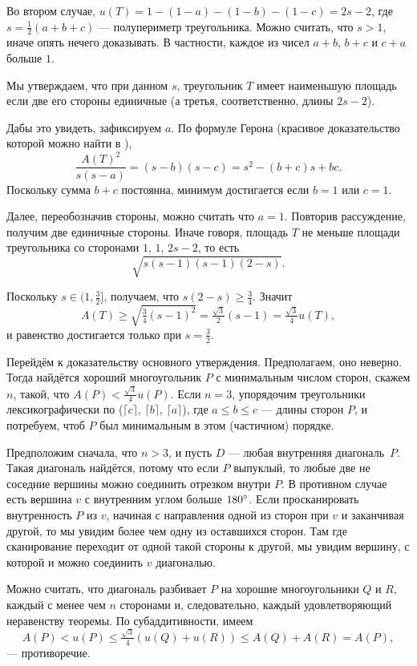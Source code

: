 Во втором случае,
$u(T)=1-(1-a)-(1-b)-(1-c)=2s-2$, где $s=\tfrac12(a+b+c)$ --- полупериметр треугольника.
Можно считать, что $s > 1$, иначе опять нечего доказывать.
В частности, каждое из чисел $a+b$, $b+c$ и $c+a$ больше $1$.

Мы утверждаем, что при данном $s$, треугольник $T$ имеет наименьшую площадь если две его стороны единичные (а третья, соответственно, длины $2s - 2$).

Дабы это увидеть, зафиксируем $a$. 
По формуле Герона (красивое доказательство которой можно найти в \cite{39}),
\[\frac{A(T)^2}{s(s-a)}=(s-b)(s-c)=s^2-(b+c)s+bc.\]
Поскольку сумма $b + c$ постоянна, минимум достигается если $b = 1$ или $c = 1$.

Далее, переобозначив стороны, можно считать что $a = 1$.
Повторив рассуждение, получим две единичные стороны.
Иначе говоря, площадь $T$ не меньше площади треугольника со сторонами $1$, $1$, $2s - 2$, то есть \[\sqrt{s(s-1)(s-1)(2-s)}.\]

Поскольку $s\in(1,\tfrac32]$, получаем, что $s(2-s)\geqslant \tfrac34$.
Значит 
\[A(T)\ge \sqrt{\tfrac34(s-1)^2}=\tfrac{\sqrt{3}}2(s-1)=\tfrac{\sqrt{3}}4u(T),\]
и равенство достигается только при $s=\tfrac32$.

Перейдём к доказательству основного утверждения.
Предполагаем, оно неверно.
Тогда найдётся хороший многоугольник $P$ с минимальным числом сторон, скажем $n$, такой, что $A(P)<\tfrac{\sqrt{3}}4 u(P)$.
Если $n=3$, упорядочим треугольники лексикографически по ($\lceil c\rceil$, $\lceil b\rceil$, $\lceil a\rceil$), где 
$a\leqslant b\leqslant c$ --- длины сторон $P$, и потребуем, чтоб $P$ был минимальным в этом (частичном) порядке.

Предположим сначала, что $n>3$, и пусть $D$ --- любая внутренняя диагональ~$P$.
Такая диагональ найдётся, потому что если $P$ выпуклый, то любые две не соседние вершины можно соединить отрезком внутри $P$.
В противном случае есть вершина $v$ с внутренним углом больше $180\degree$.
Если просканировать внутренность $P$ из $v$, начиная с направления одной из сторон при $v$ и заканчивая другой,
то мы увидим более чем одну из оставшихся сторон.
Там где сканирование переходит от одной такой стороны к другой, мы увидим вершину, с которой и можно соединить $v$ диагональю.

Можно считать, что диагональ разбивает $P$ на хорошие многоугольники $Q$ и $R$, каждый с менее чем $n$ сторонами и, следовательно, каждый удовлетворяющий неравенству теоремы.
По субаддитивности, имеем
\[A(P)<u(P)\leqslant \tfrac{\sqrt{3}}4(u(Q)+u(R))\leqslant A(Q)+A(R)=A(P),\]
--- противоречие.

